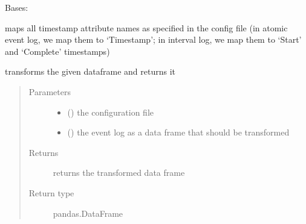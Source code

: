 \documentclass[letterpaper,10pt,english]{sphinxmanual}
\begin{document}
\begin{fulllineitems}
\label{\detokenize{event_log_analyzer:event_log_analyzer.adapter.TimestampRenamer}}
\sphinxAtStartPar
Bases: {\hyperref[\detokenize{event_log_analyzer:event_log_analyzer.adapter.Adapter}]{}}

\sphinxAtStartPar
maps all timestamp attribute names as specified in the config file (in atomic event log, we map them to ‘Timestamp’; in interval log, we map them to ‘Start’ and ‘Complete’ timestamps)

\begin{fulllineitems}
\label{\detokenize{event_log_analyzer:event_log_analyzer.adapter.TimestampRenamer.transform}}
\sphinxAtStartPar
transforms the given dataframe and returns it
\begin{quote}\begin{description}
\item[{Parameters}] \leavevmode\begin{itemize}
\item {} 
\sphinxAtStartPar
{} () \textendash{} the configuration file

\item {} 
\sphinxAtStartPar
{} () \textendash{} the event log as a data frame that should be transformed

\end{itemize}

\item[{Returns}] \leavevmode
\sphinxAtStartPar
returns the transformed data frame

\item[{Return type}] \leavevmode
\sphinxAtStartPar
pandas.DataFrame

\end{description}\end{quote}

\end{fulllineitems}


\end{fulllineitems}
\end{document}
